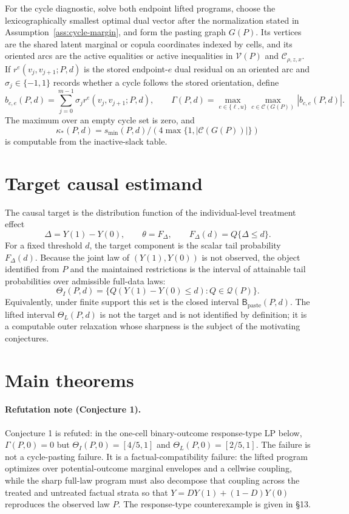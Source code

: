 \documentclass[11pt]{article}
\theoremstyle{definition}
\theoremstyle{plain}
\theoremstyle{remark}
\begin{document}
For the cycle diagnostic, solve both endpoint lifted programs, choose the lexicographically smallest optimal dual vector after the normalization stated in Assumption~\ref{ass:cycle-margin}, and form the pasting graph \(G(P)\).  Its vertices are the shared latent marginal or copula coordinates indexed by cells, and its oriented arcs are the active equalities or active inequalities in \(\mathcal V(P)\) and \(\mathcal C_{\rho,z,x}\).  If \(r^e(v_j,v_{j+1};P,d)\) is the stored endpoint-\(e\) dual residual on an oriented arc and \(\sigma_j\in\{-1,1\}\) records whether a cycle follows the stored orientation, define
\[
b_{c,e}(P,d)=\sum_{j=0}^{m-1}\sigma_j r^e(v_j,v_{j+1};P,d),
\qquad
\Gamma(P,d)=\max_{e\in\{\ell,u\}}\max_{c\in\mathcal C(G(P))}|b_{c,e}(P,d)|.
\]
The maximum over an empty cycle set is zero, and
\[
\kappa_*(P,d)=s_{\min}(P,d)/(4\max\{1,|\mathcal C(G(P))|\})
\]
is computable from the inactive-slack table.

\section{Target causal estimand}
The causal target is the distribution function of the individual-level treatment effect
\[
\Delta=Y(1)-Y(0),
\qquad
\theta=F_\Delta,
\qquad
F_\Delta(d)=Q\{\Delta\le d\}.
\]
For a fixed threshold \(d\), the target component is the scalar tail probability \(F_\Delta(d)\).  Because the joint law of \((Y(1),Y(0))\) is not observed, the object identified from \(P\) and the maintained restrictions is the interval of attainable tail probabilities over admissible full-data laws:
\[
\Theta_I(P,d)=\{Q(Y(1)-Y(0)\le d):Q\in\mathcal Q(P)\}.
\]
Equivalently, under finite support this set is the closed interval \(\mathsf B_{\mathrm{paste}}(P,d)\).  The lifted interval \(\Theta_L(P,d)\) is not the target and is not identified by definition; it is a computable outer relaxation whose sharpness is the subject of the motivating conjectures.

\section{Main theorems}
\paragraph{Refutation note (Conjecture 1).}
Conjecture 1 is refuted: in the one-cell binary-outcome response-type LP below, \(\Gamma(P,0)=0\) but \(\Theta_I(P,0)=[4/5,1]\) and \(\Theta_L(P,0)=[2/5,1]\).
The failure is not a cycle-pasting failure.  It is a factual-compatibility failure: the lifted program optimizes over potential-outcome marginal envelopes and a cellwise coupling, while the sharp full-law program must also decompose that coupling across the treated and untreated factual strata so that \(Y=DY(1)+(1-D)Y(0)\) reproduces the observed law \(P\).  The response-type counterexample is given in \S13.
\end{document}
